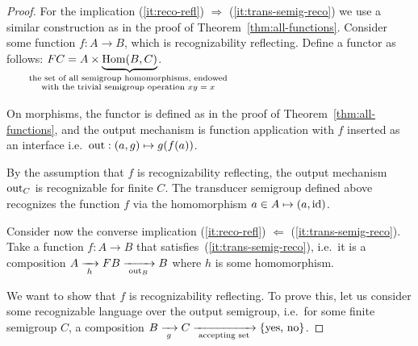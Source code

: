 \begin{proof}
    For the implication (\ref{it:reco-refl}) $\Rightarrow$ (\ref{it:trans-semig-reco}) we  use a similar construction as in the proof of Theorem~\ref{thm:all-functions}.
    Consider some function $f : A \to B$, which is recognizability reflecting. Define  a functor as follows:
    $\functor C = A \times \displaystyle\myunderbrace{\mathrm{Hom}(B,C)}{the set of all semigroup homomorphisms, endowed\\
    with the trivial semigroup operation $xy = x$}$.

    On morphisms, the functor is defined as in the proof of Theorem~\ref{thm:all-functions}, and the output mechanism  is function application with $f$ inserted as an interface i.e.~$\mathrm{out} : (a,g) \mapsto g(f(a))$.

    By the assumption that $f$ is recognizability reflecting, the output mechanism $\mathrm{out}_C$ is recognizable for finite $C$. The transducer semigroup defined above recognizes the function $f$ via the homomorphism $a \in A  \mapsto  (a,\mathrm{id})$.
    
    
Consider now the converse implication (\ref{it:reco-refl}) $\Leftarrow$ (\ref{it:trans-semig-reco}). Take a function $f : A \to B$ that satisfies~(\ref{it:trans-semig-reco}), i.e.~it is a composition $A \xrightarrow[\;h\;]{} \functor B \xrightarrow[\;\outfun_B\;]{} B$
where $h$ is some homomorphism.

We want to show that $f$ is recognizability reflecting. To prove this, let us consider some recognizable language over the output semigroup, i.e.\ for some finite semigroup $C$, a composition $B \xrightarrow[\;g\;]{} C \xrightarrow[\;\text{accepting set}\;]{} \{\text{yes, no}\}$.


\end{proof}
